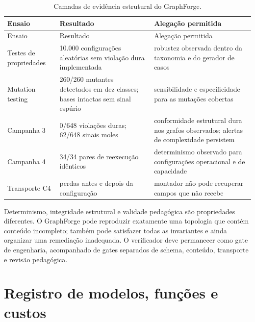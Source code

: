\documentclass[11pt,a4paper]{article}
\begin{document}
\begingroup
\small
\setlength{\tabcolsep}{3pt}
\begin{longtable}{@{}P{3.4cm}P{6.0cm}P{4.6cm}@{}}
\caption{Camadas de evidência estrutural do GraphForge.}\label{tab:graphforge-evidence}\\
\toprule
Ensaio & Resultado & Alegação permitida \\
\midrule
\endfirsthead
\toprule
Ensaio & Resultado & Alegação permitida \\
\midrule
\endhead
Testes de propriedades & 10.000 configurações aleatórias sem violação dura implementada & robustez observada dentro da taxonomia e do gerador de casos \\
Mutation testing & 260/260 mutantes detectados em dez classes; bases intactas sem sinal espúrio & sensibilidade e especificidade para as mutações cobertas \\
Campanha 3 & 0/648 violações duras; 62/648 sinais moles & conformidade estrutural dura nos grafos observados; alertas de complexidade persistem \\
Campanha 4 & 34/34 pares de reexecução idênticos & determinismo observado para configurações operacional e de capacidade \\
Transporte C4 & perdas antes e depois da configuração & montador não pode recuperar campos que não recebe \\
\bottomrule
\end{longtable}
\endgroup

Determinismo, integridade estrutural e validade pedagógica são propriedades diferentes. O GraphForge pode reproduzir exatamente uma topologia que contém conteúdo incompleto; também pode satisfazer todas as invariantes e ainda organizar uma remediação inadequada. O verificador deve permanecer como gate de engenharia, acompanhado de gates separados de schema, conteúdo, transporte e revisão pedagógica.

\section{Registro de modelos, funções e custos}
\end{document}
